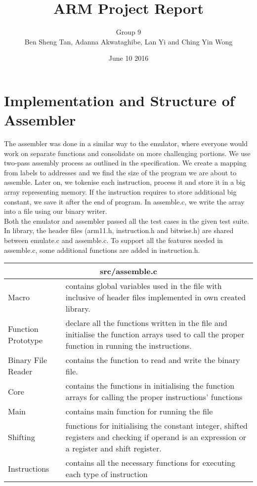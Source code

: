 \documentclass[9pt]{article}
\title{ARM Project Report}
\author{Group 9\\Ben Sheng Tan, Adanna Akwataghibe, Lan Yi and Ching Yin Wong}
\date{June 10 2016}
\begin{document}
\maketitle

\section{Implementation and Structure of Assembler}

The assembler was done in a similar way to the emulator, where everyone would work on separate functions and consolidate on more challenging portions. We use two-pass assembly process as outlined in the specification. We create a mapping from labels to addresses and we find the size of the program we are about to assemble. Later on, we tokenise each instruction, process it and store it in a big array representing memory. If the instruction requires to store additional big constant, we save it after the end of program. In assemble.c, we write the array into a file using our binary writer.\\

Both the emulator and assembler passed all the test cases in the given test suite. In library, the header files (arm11.h, instruction.h and bitwise.h) are shared between emulate.c and assemble.c. To support all the features needed in assemble.c, some additional functions are added in instruction.h.

\medskip

\begin{tabular}{ |p{5cm}|p{10cm}| } 
\hline
\multicolumn{2}{|c|}{src/assemble.c} \\
\hline
Macro & contains global variables used in the file with inclusive of header files implemented in own created library. \\ 
\hline
Function Prototype &  declare all the functions written in the file and initialise the function arrays used to call the proper function in running the instructions. \\ 
\hline
Binary File Reader &  contains the function to read and write the binary file. \\ 
\hline
Core & contains the functions in initialising the function arrays for calling the proper instructions' functions \\
\hline
Main & contains main function for running the file \\
\hline
Shifting & functions for initialising the constant integer, shifted registers and checking if operand is an expression or a register and shift register. \\
\hline
Instructions & contains all the necessary functions for executing each type of instruction \\
\hline
\end{tabular}
\end{document}
